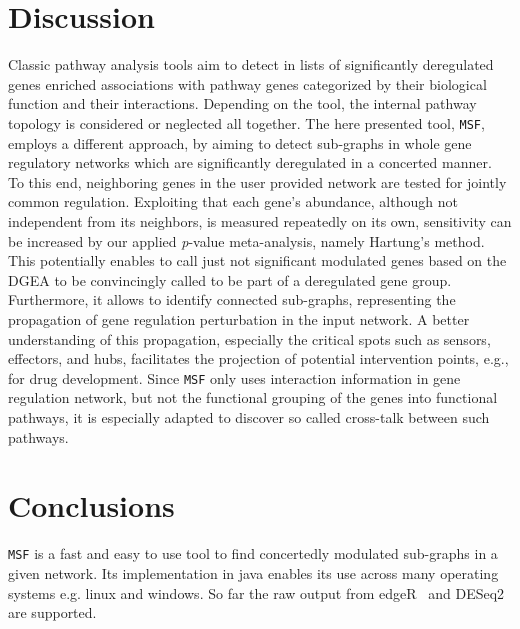 \documentclass[10pt,a4paper,twocolumn]{article}
\begin{document}
	\section*{Discussion}
	
	Classic pathway analysis tools aim to detect in lists of
        significantly deregulated genes enriched associations with
        pathway genes categorized by their biological function and
        their interactions. Depending on the tool, the internal
        pathway topology is considered or neglected all together. The
        here presented tool, \texttt{MSF}, employs a different
        approach, by aiming to detect sub-graphs in whole gene
        regulatory networks which are significantly deregulated in a
        concerted manner. To this end, neighboring genes in the user
        provided network are tested for jointly common
        regulation. Exploiting that each gene's abundance, although
        not independent from its neighbors, is measured repeatedly on
        its own, sensitivity can be increased by our applied
        \textit{p}-value meta-analysis, namely Hartung's method. This
        potentially enables to call just not significant modulated
        genes based on the DGEA to be convincingly called to be part
        of a deregulated gene group.  Furthermore, it allows to
        identify connected sub-graphs, representing the propagation of
        gene regulation perturbation in the input network. A better
        understanding of this propagation, especially the critical
        spots such as sensors, effectors, and hubs, facilitates the
        projection of potential intervention points, e.g., for drug
        development. Since \texttt{MSF} only uses interaction
        information in gene regulation network, but not the functional
        grouping of the genes into functional pathways, it is
        especially adapted to discover so called cross-talk between
        such pathways.
	
	
	\section*{Conclusions}
	
	
	\texttt{MSF} is a fast and easy to use tool to find
        concertedly modulated sub-graphs in a given network. Its
        implementation in java enables its use across many operating
        systems e.g. linux and windows. So far the raw output from
        edgeR~\cite{edgeR} and DESeq2~\cite{love2014moderated} are
        supported.
	
\end{document}
